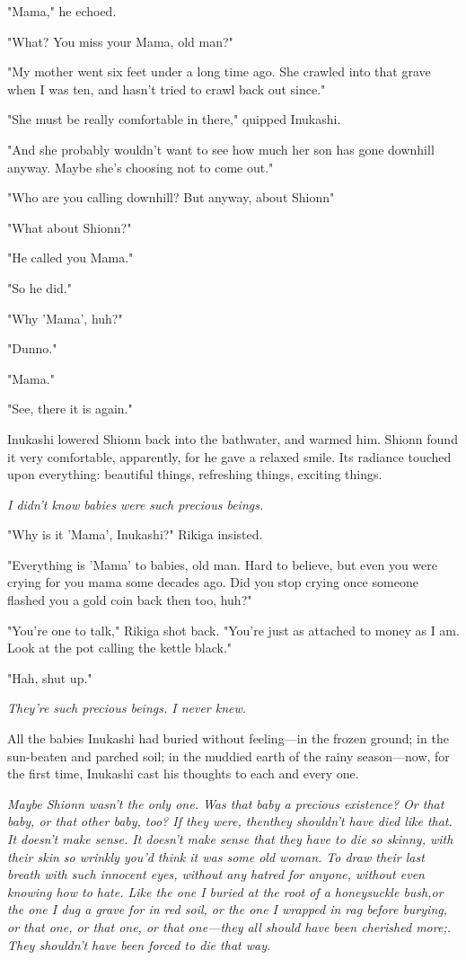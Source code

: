 "Mama," he echoed.

"What? You miss your Mama, old man?"

"My mother went six feet under a long time ago. She crawled into that
grave when I was ten, and hasn't tried to crawl back out since."

"She must be really comfortable in there," quipped Inukashi.

"And she probably wouldn't want to see how much her son has gone
downhill anyway. Maybe she's choosing not to come out."

"Who are you calling downhill? But anyway, about Shionn\el "

"What about Shionn?"

"He called you Mama."

"So he did."

"Why 'Mama', huh?"

"Dunno."

"Mama."

"See, there it is again."

Inukashi lowered Shionn back into the bathwater, and warmed him. Shionn
found it very comfortable, apparently, for he gave a relaxed smile. Its
radiance touched upon everything: beautiful things, refreshing things,
exciting things.

\emph{I didn't know babies were such precious beings.}

"Why is it 'Mama', Inukashi?" Rikiga insisted.

"Everything is 'Mama' to babies, old man. Hard to believe, but even you
were crying for you mama some decades ago. Did you stop crying once
someone flashed you a gold coin back then too, huh?"

"You're one to talk," Rikiga shot back. "You're just as attached to
money as I am. Look at the pot calling the kettle black."

"Hah, shut up."

\emph{They're such precious beings. I never knew.}

All the babies Inukashi had buried without feeling---in the frozen ground;
in the sun-beaten and parched soil; in the muddied earth of the rainy
season---now, for the first time, Inukashi cast his thoughts to each and
every one.

\emph{Maybe Shionn wasn't the only one. Was that baby a precious existence? Or
that baby, or that other baby, too? If they were, then\el they shouldn't
have died like that. It doesn't make sense. It doesn't make sense that
they have to die so skinny, with their skin so wrinkly you'd think it
was some old woman. To draw their last breath with such innocent eyes,
without any hatred for anyone, without even knowing how to hate. Like
the one I buried at the root of a honeysuckle bush,or the one I dug a
grave for in red soil, or the one I wrapped in rag before burying, or
that one, or that one, or that one---they all should have been cherished
more;. They shouldn't have been forced to die that way.}

